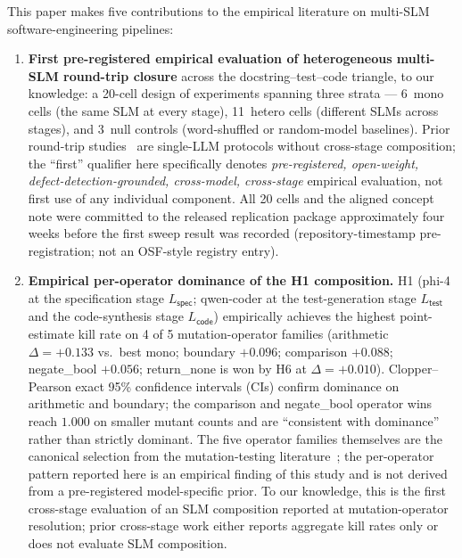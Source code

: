 This paper makes five contributions to the empirical literature on multi-SLM software-engineering pipelines:

\begin{enumerate}
  \item \textbf{First pre-registered empirical evaluation of heterogeneous multi-SLM round-trip closure} across the docstring--test--code triangle, to our knowledge: a 20-cell design of experiments spanning three strata --- 6~mono cells (the same SLM at every stage), 11~hetero cells (different SLMs across stages), and 3~null controls (word-shuffled or random-model baselines). Prior round-trip studies~\citep{Allamanis2024RTC, Zhang2025CodingTriangle, Li2024MBCT} are single-LLM protocols without cross-stage composition; the ``first'' qualifier here specifically denotes \emph{pre-registered, open-weight, defect-detection-grounded, cross-model, cross-stage} empirical evaluation, not first use of any individual component. All 20 cells and the aligned concept note were committed to the released replication package approximately four weeks before the first sweep result was recorded (repository-timestamp pre-registration; not an OSF-style registry entry).

  \item \textbf{Empirical per-operator dominance of the H1 composition.} H1 (phi-4 at the specification stage $L_{\textsf{spec}}$; qwen-coder at the test-generation stage $L_{\textsf{test}}$ and the code-synthesis stage $L_{\textsf{code}}$) empirically achieves the highest point-estimate kill rate on 4 of 5 mutation-operator families (arithmetic $\Delta = +0.133$ vs.\ best mono; boundary $+0.096$; comparison $+0.088$; negate\_bool $+0.056$; return\_none is won by H6 at $\Delta = +0.010$). Clopper--Pearson exact 95\% confidence intervals (CIs) confirm dominance on arithmetic and boundary; the comparison and negate\_bool operator wins reach $1.000$ on smaller mutant counts and are ``consistent with dominance'' rather than strictly dominant. The five operator families themselves are the canonical selection from the mutation-testing literature~\citep{Andrews2005MutationAnalysis, Just2014MutationAnalysis}; the per-operator pattern reported here is an empirical finding of this study and is not derived from a pre-registered model-specific prior. To our knowledge, this is the first cross-stage evaluation of an SLM composition reported at mutation-operator resolution; prior cross-stage work either reports aggregate kill rates only or does not evaluate SLM composition.


\end{enumerate}
